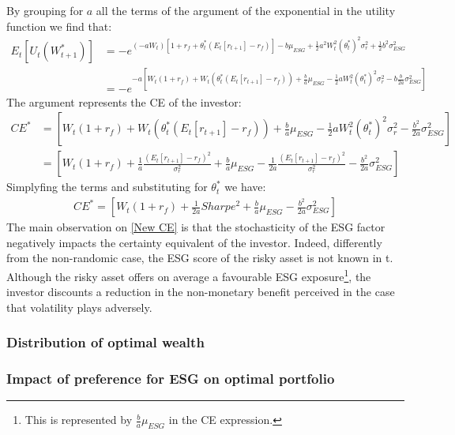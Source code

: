 \documentclass[12pt]{article}
\begin{document}
	By grouping for $a$ all the terms of the argument of the exponential in the utility function we find that:
	\begin{align*}
		E_t[U_{t}(W_{t+1}^{*})] &= -e^{(-aW_t) [1 + r_f + \theta_t^*(E_{t}[r_{t+1}]-r_f)] - b\mu_{ESG} + \frac{1}{2}a^2W_t^2(\theta_t^*)^2\sigma_r^2 +\frac{1}{2}b^2\sigma_{ESG}^2 } \\
		&= -e^{-a [W_t(1 + r_f) + W_t(\theta_t^*(E_{t}[r_{t+1}]-r_f)) + \frac{b}{a}\mu_{ESG} - \frac{1}{2}aW_t^2(\theta_t^{*})^2\sigma_r^2 -b\frac{b}{2a}\sigma_{ESG}^2]}
	\end{align*} %
	The argument represents the CE of the investor: 
	\begin{align*}
		CE^* &= [W_t(1 + r_f) + W_t(\theta_t^*(E_{t}[r_{t+1}]-r_f)) + \frac{b}{a}\mu_{ESG} - \frac{1}{2}aW_t^2(\theta_t^{*})^2\sigma_r^2 -\frac{b^2}{2a}\sigma_{ESG}^2] \\
		&= [W_t(1 + r_f) + \frac{1}{a}\frac{(E_{t}[r_{t+1}]-r_f)^2}{\sigma_r^2} + \frac{b}{a}\mu_{ESG} - \frac{1}{2a}\frac{(E_{t}[r_{t+1}]-r_f)^2}{\sigma_r^2}-\frac{b^2}{2a}\sigma_{ESG}^2]
	\end{align*}
	Simplyfing the terms and substituting for $\theta_t^{*}$ we have: \vspace{-0.5em}
	\begin{align} \label{New CE}
		CE^* = [W_t(1 + r_f) + \frac{1}{2a}Sharpe^2 + \frac{b}{a}\mu_{ESG} -\frac{b^2}{2a}\sigma_{ESG}^2]
	\end{align} \vspace{-0.5em}
	The main observation on \ref{New CE} is that the stochasticity of the ESG factor negatively impacts the certainty equivalent of the investor. Indeed, differently from the non-randomic case, the ESG score of the risky asset is not known in t.\\ Although the risky asset offers on average a favourable ESG exposure\footnote{This is represented by $\frac{b}{a}\mu_{ESG}$ in the CE expression.}, the investor discounts a reduction in the non-monetary benefit perceived in the case that volatility plays adversely.  
	\subsubsection{Distribution of optimal wealth}
	\subsubsection{Impact of preference for ESG on optimal portfolio}
	
\end{document}
